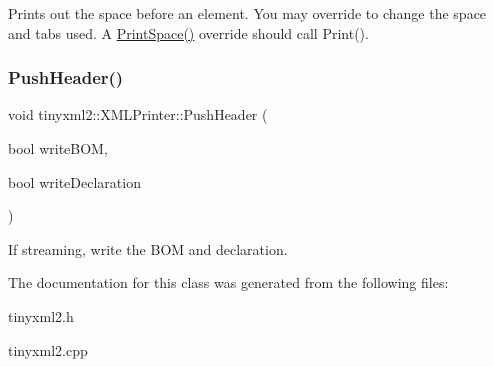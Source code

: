 Prints out the space before an element. You may override to change the space and tabs used. A \mbox{\hyperlink{classtinyxml2_1_1_x_m_l_printer_a1c4b2ccbe4fdb316d54f5a93f3559260}{Print\+Space()}} override should call Print(). \mbox{\label{classtinyxml2_1_1_x_m_l_printer_a178c608ce8476043d5d6513819cde903}} 
\subsubsection{\texorpdfstring{PushHeader()}{PushHeader()}}
{\footnotesize\ttfamily void tinyxml2\+::\+X\+M\+L\+Printer\+::\+Push\+Header (\begin{DoxyParamCaption}\item[{bool}]{write\+B\+OM,  }\item[{bool}]{write\+Declaration }\end{DoxyParamCaption})}

If streaming, write the B\+OM and declaration. 

The documentation for this class was generated from the following files\+:\begin{DoxyCompactItemize}
\item 
tinyxml2.\+h\item 
tinyxml2.\+cpp\end{DoxyCompactItemize}
